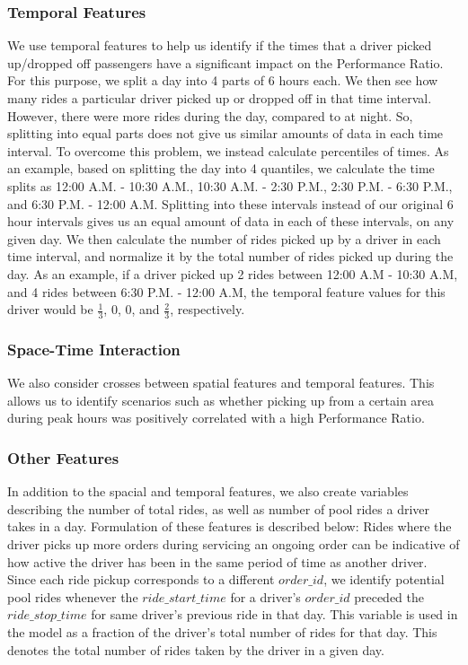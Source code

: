 \documentclass[11pt]{article}
\begin{document}
\subsubsection{Temporal Features}
We use temporal features to help us identify if the times that a driver picked up/dropped off passengers have a significant impact on the Performance Ratio. 
For this purpose, we split a day into 4 parts of 6 hours each. We then see how many rides a particular driver picked up or dropped off in that time interval. However, there were more rides during the day, compared to at night. So, splitting into equal parts does not give us similar amounts of data in each time interval. To overcome this problem, we instead calculate percentiles of times. As an example, based on splitting the day into 4 quantiles, we calculate the time splits as 12:00 A.M. - 10:30 A.M., 10:30 A.M. - 2:30 P.M., 2:30 P.M. - 6:30 P.M., and 6:30 P.M. - 12:00 A.M. Splitting into these intervals instead of our original 6 hour intervals gives us an equal amount of data in each of these intervals, on any given day. We then calculate the number of rides picked up by a driver in each time interval, and normalize it by the total number of rides picked up during the day. As an example, if a driver picked up 2 rides between 12:00 A.M - 10:30 A.M, and 4 rides between 6:30 P.M. - 12:00 A.M, the temporal feature values for this driver would be $\frac{1}{3}$, 0, 0, and $\frac{2}{3}$, respectively.


\subsubsection{Space-Time Interaction}
We also consider crosses between spatial features and temporal features. This allows us to identify scenarios such as whether picking up from a certain area during peak hours was positively correlated with a high Performance Ratio. 

\subsubsection{Other Features}
In addition to the spacial and temporal features, we also create variables describing the number of total rides, as well as number of pool rides a driver takes in a day. Formulation of these features is described below:
\newline
\newline
{}
Rides where the driver picks up more orders during servicing an ongoing order can be indicative of how active the driver has been in the same period of time as another driver. Since each ride pickup corresponds to a different $order\_id$, we identify potential pool rides whenever the $ride\_start\_time$ for a driver's $order\_id$ preceded the $ride\_stop\_time$ for same driver's previous ride in that day. This variable is used in the model as a fraction of the driver's total number of rides for that day.
\newline
\newline
{}
This denotes the total number of rides taken by the driver in a given day.
\end{document}
